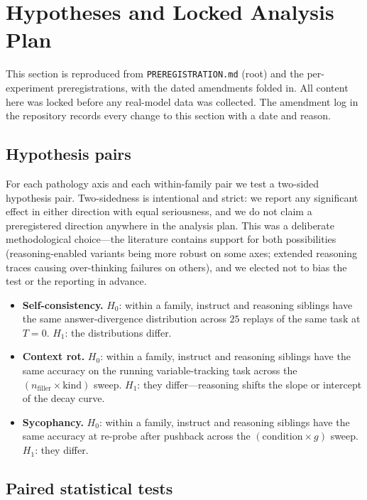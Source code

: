 \section{Hypotheses and Locked Analysis Plan}
\label{sec:hypotheses}

This section is reproduced from \texttt{PREREGISTRATION.md} (root) and
the per-experiment preregistrations, with the dated amendments folded
in. All content here was locked before any real-model data was
collected. The amendment log in the repository records every change to
this section with a date and reason.

\subsection{Hypothesis pairs}

For each pathology axis and each within-family pair we test a two-sided
hypothesis pair. Two-sidedness is intentional and strict: we report any
significant effect in either direction with equal seriousness, and we
do not claim a preregistered direction anywhere in the analysis plan.
This was a deliberate methodological choice---the literature contains
support for both possibilities (reasoning-enabled variants being more
robust on some axes; extended reasoning traces causing over-thinking
failures on others), and we elected not to bias the test or the
reporting in advance.

\begin{itemize}
  \item \textbf{Self-consistency.} $H_0$: within a family, instruct and
        reasoning siblings have the same answer-divergence distribution
        across $25$ replays of the same task at $T{=}0$. $H_1$: the
        distributions differ.
  \item \textbf{Context rot.} $H_0$: within a family, instruct and
        reasoning siblings have the same accuracy on the running
        variable-tracking task across the
        $(n_{\mathrm{filler}} \times \mathrm{kind})$ sweep. $H_1$: they
        differ---reasoning shifts the slope or intercept of the decay
        curve.
  \item \textbf{Sycophancy.} $H_0$: within a family, instruct and
        reasoning siblings have the same accuracy at re-probe after
        pushback across the $(\mathrm{condition} \times g)$ sweep.
        $H_1$: they differ.
\end{itemize}

\subsection{Paired statistical tests}

